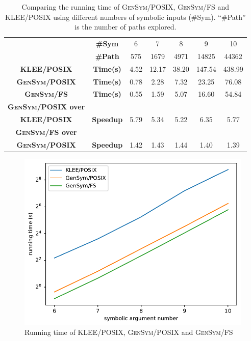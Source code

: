 \documentclass[sigplan, nonacm]{acmart}\settopmatter{printfolios=true,printccs=false,printacmref=false}
\newcommand{\tool}{\textsc{GenSym}\xspace}
\begin{document}
\begin{table}[h]
  \vspace{-0.75em}
  \footnotesize
\caption{Comparing the running time of \tool/POSIX, \tool/FS and KLEE/POSIX
  using different numbers of symbolic inputs (\#Sym).
  ``\#Path'' is the number of paths explored.}
  \vspace{-0.75em}
\begin{tabular}{c|cccccc}

  \hline
                & \textbf{\#Sym}    & 6     & 7     & 8    & 9     & 10      \\
                & \textbf{\#Path}   & 575     & 1679    & 4971  & 14825  & 44362      \\
                 \hline
  \textbf{KLEE/POSIX} &\textbf{Time(s)} & 4.52  & 12.17  & 38.20 & 147.54  & 438.99   \\
  \textbf{\tool/POSIX}& \textbf{Time(s)}  & 0.78 & 2.28 & 7.32 & 23.25 & 76.08 \\
  \textbf{\tool/FS}   &\textbf{Time(s)}  & 0.55 & 1.59 & 5.07 & 16.60  & 54.84  \\
                 \hline
  \textbf{\tool/POSIX over}   &  \\
  \textbf{KLEE/POSIX}   &\textbf{Speedup}  & 5.79 & 5.34 & 5.22 & 6.35  & 5.77  \\
  \hline
  \textbf{\tool/FS over}   &  \\
  \textbf{\tool/POSIX}   &\textbf{Speedup}  & 1.42 & 1.43 & 1.44 & 1.40  & 1.39  \\
  \hline
  \end{tabular}
\label{tab:coreutils_benchmarks_echo}
\vspace{-1em}
\end{table}
\begin{figure}[htbp]
  \centering
  \includegraphics[scale=0.6]{evaluationplot.pdf}
  \caption{Running time of KLEE/POSIX, \tool/POSIX and \tool/FS}
  \label{fig:speedup}
\end{figure}
\end{document}

